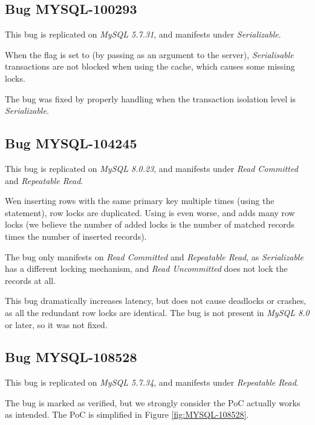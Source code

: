 \subsection*{Bug MYSQL-100293}

This bug is replicated on \textit{MySQL 5.7.31}, and manifests under \textit{Serializable}.

When the  flag is set to  (by passing  as an argument to the server), \textit{Serialisable} transactions are not blocked when using the cache, which causes some missing locks.

The bug was fixed by properly handling  when the transaction isolation level is \textit{Serializable}.

\subsection*{Bug MYSQL-104245}


This bug is replicated on \textit{MySQL 8.0.23}, and manifests under \textit{Read Committed} and \textit{Repeatable Read}.

Wen inserting rows with the same primary key multiple times (using the  statement), row locks are duplicated. Using  is even worse, and adds many row locks (we believe the number of added locks is the number of matched records times the number of inserted records).

The bug only manifests on \textit{Read Committed} and \textit{Repeatable Read}, as \textit{Serializable} has a different locking mechanism, and \textit{Read Uncommitted} does not lock the records at all.

This bug dramatically increases latency, but does not cause deadlocks or crashes, as all the redundant row locks are identical. The bug is not present in \textit{MySQL 8.0} or later, so it was not fixed.

\subsection*{Bug MYSQL-108528}

This bug is replicated on \textit{MySQL 5.7.34}, and manifests under \textit{Repeatable Read}.

The bug is marked as verified, but we strongly consider the PoC actually works as intended. The PoC is simplified in Figure \ref{fig:MYSQL-108528}.


